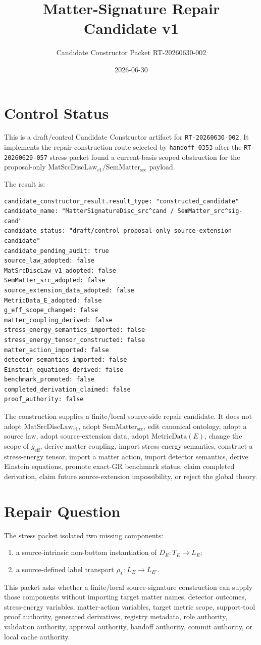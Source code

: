 \documentclass[11pt]{article}
\title{Matter-Signature Repair Candidate v1}
\author{Candidate Constructor Packet RT-20260630-002}
\date{2026-06-30}
\newcommand{\MetricData}{\mathrm{MetricData}}
\newcommand{\geff}{g_{\mathrm{eff}}}
\newcommand{\MatSrcDiscLaw}{\mathrm{MatSrcDiscLaw}_{v1}}
\newcommand{\SemMatterSrc}{\mathrm{SemMatter}_{\mathrm{src}}}
\begin{document}
\maketitle

\section{Control Status}

This is a draft/control Candidate Constructor artifact for
\texttt{RT-20260630-002}. It implements the repair-construction route selected
by \texttt{handoff-0353} after the \texttt{RT-20260629-057} stress packet
found a current-basis scoped obstruction for the proposal-only
\(\MatSrcDiscLaw / \SemMatterSrc\) payload.

The result is:
\begin{verbatim}
candidate_constructor_result.result_type: "constructed_candidate"
candidate_name: "MatterSignatureDisc_src^cand / SemMatter_src^sig-cand"
candidate_status: "draft/control proposal-only source-extension candidate"
candidate_pending_audit: true
source_law_adopted: false
MatSrcDiscLaw_v1_adopted: false
SemMatter_src_adopted: false
source_extension_data_adopted: false
MetricData_E_adopted: false
g_eff_scope_changed: false
matter_coupling_derived: false
stress_energy_semantics_imported: false
stress_energy_tensor_constructed: false
matter_action_imported: false
detector_semantics_imported: false
Einstein_equations_derived: false
benchmark_promoted: false
completed_derivation_claimed: false
proof_authority: false
\end{verbatim}

The construction supplies a finite/local source-side repair candidate. It does
not adopt \(\MatSrcDiscLaw\), adopt \(\SemMatterSrc\), edit canonical
ontology, adopt a source law, adopt source-extension data, adopt
\(\MetricData(E)\), change the scope of \(\geff\), derive matter coupling,
import stress-energy semantics, construct a stress-energy tensor, import a
matter action, import detector semantics, derive Einstein equations, promote
exact-GR benchmark status, claim completed derivation, claim future
source-extension impossibility, or reject the global theory.

\section{Repair Question}

The stress packet isolated two missing components:
\begin{enumerate}[leftmargin=*]
\item a source-intrinsic non-bottom instantiation of \(D_E:T_E\to L_E\);
\item a source-defined label transport \(\rho_L:L_E\to L_{E'}\).
\end{enumerate}
This packet asks whether a finite/local source-signature construction can
supply those components without importing target matter names, detector
outcomes, stress-energy variables, matter-action variables, target metric
scope, support-tool proof authority, generated derivatives, registry
metadata, role authority, validation authority, approval authority, handoff
authority, commit authority, or local cache authority.
\end{document}
